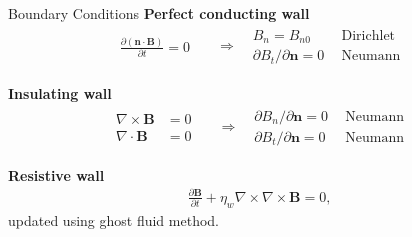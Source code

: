 \documentclass[final]{beamer}
\begin{document}
\begin{frame}{}
\begin{textblock}{19.5}
\begin{block}{Boundary Conditions}
\textbf{Perfect conducting wall}
\begin{align*}
	\begin{aligned}
		\frac{\partial \left(\mathbf{n}\cdot\mathbf{B}\right)}{\partial t}= 0
	\end{aligned}
	\ \ \ 
	& \Rightarrow 
	\ \ \ 
	\begin{aligned}
		B_n=B_{n0}&\ \ \text{Dirichlet}\ \\
		{\partial B_t}/{\partial \mathbf{n}}=0&\ \ \text{Neumann}
	\end{aligned}
\end{align*}

\vspace{0.3cm}
\textbf{Insulating wall}
\begin{align*}
	\begin{aligned}
		\nabla \times \mathbf{B} &= 0 \\
		\nabla \cdot \mathbf{B} &= 0
	\end{aligned}
	\ \ \ 
	& \Rightarrow 
	\ \ \ 
	\begin{aligned}
		\partial B_n/\partial \mathbf{n} = 0&\ \ \text{Neumann}\\
		{\partial B_t}/{\partial \mathbf{n}}=0&\ \ \text{Neumann}
	\end{aligned}
\end{align*}

\vspace{0.5cm}
\textbf{Resistive wall}
\begin{align*}
\frac{\partial \mathbf{B}}{\partial t}+\eta_{w}\nabla\times\nabla\times\mathbf{B}=0
\label{equ:magneticDiffusion},
\end{align*}
updated using ghost fluid method.
\end{block}


\end{textblock}



\end{frame}
\end{document}
